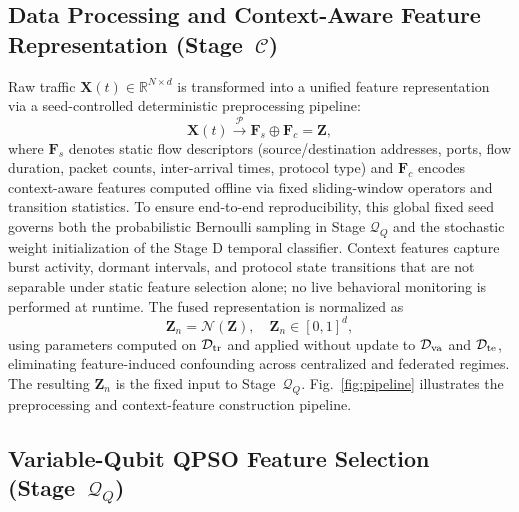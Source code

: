 \documentclass[conference]{IEEEtran}
\begin{document}
\subsection{Data Processing and Context-Aware Feature
            Representation (Stage~$\mathcal{C}$)}
\label{subsec:feature_pipeline}

Raw traffic $\mathbf{X}(t)\in\mathbb{R}^{N\times d}$ is
transformed into a unified feature representation via a
seed-controlled deterministic preprocessing pipeline:
\begin{equation}
\mathbf{X}(t) \xrightarrow{\mathcal{P}}
\mathbf{F}_s \oplus \mathbf{F}_c = \mathbf{Z},
\label{eq:feature_fusion}
\end{equation}
where $\mathbf{F}_s$ denotes static flow descriptors
(source/destination addresses, ports, flow duration, packet counts,
inter-arrival times, protocol type) and $\mathbf{F}_c$ encodes
context-aware features computed offline via fixed sliding-window operators and transition statistics. To ensure end-to-end reproducibility, this global fixed seed governs both the probabilistic Bernoulli sampling in Stage $\mathcal{Q}_{Q}$ and the stochastic weight initialization of the Stage D temporal classifier. Context features capture burst
activity, dormant intervals, and protocol state transitions that
are not separable under static feature selection alone; no live
behavioral monitoring is performed at runtime. The fused
representation is normalized as
\begin{equation}
\mathbf{Z}_n = \mathcal{N}(\mathbf{Z}),\quad
\mathbf{Z}_n \in [0,1]^d,
\label{eq:normalization}
\end{equation}
using parameters computed on $\mathcal{D}_{\rm tr}$ and applied
without update to $\mathcal{D}_{\rm va}$ and $\mathcal{D}_{\rm te}$,
eliminating feature-induced confounding across centralized and
federated regimes. The resulting $\mathbf{Z}_n$ is the fixed input
to Stage~$\mathcal{Q}_{Q}$. Fig.~\ref{fig:pipeline} illustrates
the preprocessing and context-feature construction pipeline.

\subsection{Variable-Qubit QPSO Feature Selection
            (Stage~$\mathcal{Q}_{Q}$)}
\label{subsec:qpsomethod}
\end{document}
